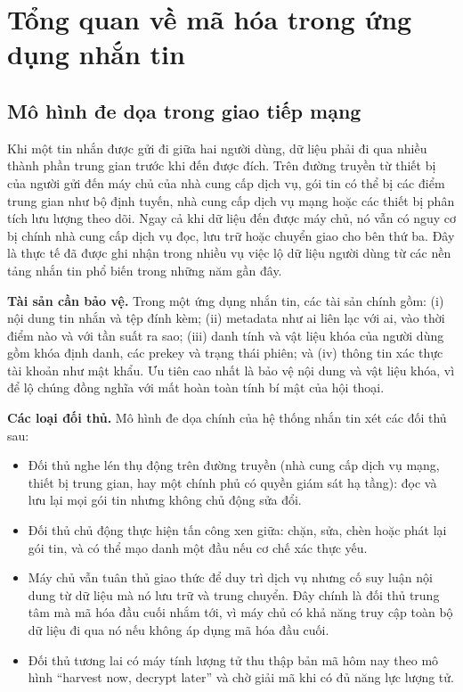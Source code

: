 ﻿\section{Tổng quan về mã hóa trong ứng dụng nhắn tin}

\subsection{Mô hình đe dọa trong giao tiếp mạng}

Khi một tin nhắn được gửi đi giữa hai người dùng, dữ liệu phải đi qua nhiều thành phần trung gian trước khi đến được đích. Trên đường truyền từ thiết bị của người gửi đến máy chủ của nhà cung cấp dịch vụ, gói tin có thể bị các điểm trung gian như bộ định tuyến, nhà cung cấp dịch vụ mạng hoặc các thiết bị phân tích lưu lượng theo dõi. Ngay cả khi dữ liệu đến được máy chủ, nó vẫn có nguy cơ bị chính nhà cung cấp dịch vụ đọc, lưu trữ hoặc chuyển giao cho bên thứ ba. Đây là thực tế đã được ghi nhận trong nhiều vụ việc lộ dữ liệu người dùng từ các nền tảng nhắn tin phổ biến trong những năm gần đây.

\textbf{Tài sản cần bảo vệ.} Trong một ứng dụng nhắn tin, các tài sản chính gồm: (i) nội dung tin nhắn và tệp đính kèm; (ii) metadata như ai liên lạc với ai, vào thời điểm nào và với tần suất ra sao; (iii) danh tính và vật liệu khóa của người dùng gồm khóa định danh, các prekey và trạng thái phiên; và (iv) thông tin xác thực tài khoản như mật khẩu. Ưu tiên cao nhất là bảo vệ nội dung và vật liệu khóa, vì để lộ chúng đồng nghĩa với mất hoàn toàn tính bí mật của hội thoại.

\textbf{Các loại đối thủ.} Mô hình đe dọa chính của hệ thống nhắn tin xét các đối thủ sau:
\begin{itemize}
  \item Đối thủ nghe lén thụ động trên đường truyền (nhà cung cấp dịch vụ mạng, thiết bị trung gian, hay một chính phủ có quyền giám sát hạ tầng): đọc và lưu lại mọi gói tin nhưng không chủ động sửa đổi.
  \item Đối thủ chủ động thực hiện tấn công xen giữa: chặn, sửa, chèn hoặc phát lại gói tin, và có thể mạo danh một đầu nếu cơ chế xác thực yếu.
  \item Máy chủ vẫn tuân thủ giao thức để duy trì dịch vụ nhưng cố suy luận nội dung từ dữ liệu mà nó lưu trữ và trung chuyển. Đây chính là đối thủ trung tâm mà mã hóa đầu cuối nhắm tới, vì máy chủ có khả năng truy cập toàn bộ dữ liệu đi qua nó nếu không áp dụng mã hóa đầu cuối.
  \item Đối thủ tương lai có máy tính lượng tử thu thập bản mã hôm nay theo mô hình ``harvest now, decrypt later'' và chờ giải mã khi có đủ năng lực lượng tử.
\end{itemize}

